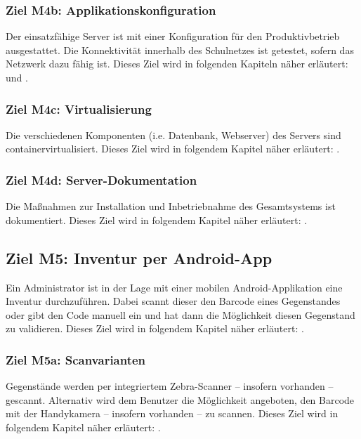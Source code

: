 \documentclass[
    headings=optiontotocandhead,%
    twoside,
    numbers=noenddot,%
    toc=flat, %
    12pt, %
    titlepage, %
    parskip=full, %
    listof=totoc, %
    listof=flat, %
    numbers=noenddot, %
    bibliography=totoc, %
    a4paper,DIV=14,
    BCOR=15mm,
]{scrbook}
\begin{document}
      \subsubsection*{Ziel M4b: Applikationskonfiguration}

      Der einsatzfähige Server ist mit einer Konfiguration für den Produktivbetrieb ausgestattet. Die Konnektivität innerhalb des Schulnetzes ist getestet, sofern das Netzwerk dazu fähig ist.
      Dieses Ziel wird in folgenden Kapiteln näher erläutert: und .
      
      \subsubsection*{Ziel M4c: Virtualisierung}

      Die verschiedenen Komponenten (i.e. Datenbank, Webserver) des Servers sind containervirtualisiert.  
      Dieses Ziel wird in folgendem Kapitel näher erläutert: .

      \subsubsection*{Ziel M4d: Server-Dokumentation}

      Die Maßnahmen zur Installation und Inbetriebnahme des Gesamtsystems ist dokumentiert.
      Dieses Ziel wird in folgendem Kapitel näher erläutert: .


      \subsection*{Ziel M5: Inventur per Android-App}

      Ein Administrator ist in der Lage mit einer mobilen Android-Applikation eine Inventur durchzuführen. Dabei scannt dieser den Barcode eines Gegenstandes oder gibt den Code manuell ein und hat dann die Möglichkeit diesen Gegenstand zu validieren. 
      Dieses Ziel wird in folgendem Kapitel näher erläutert: .
      
    
      \subsubsection*{Ziel M5a: Scanvarianten}

        Gegenstände werden per integriertem Zebra-Scanner – insofern vorhanden – gescannt. Alternativ wird dem Benutzer die Möglichkeit angeboten, den Barcode mit der Handykamera – insofern vorhanden – zu scannen. 
        Dieses Ziel wird in folgendem Kapitel näher erläutert: .
      
\end{document}
